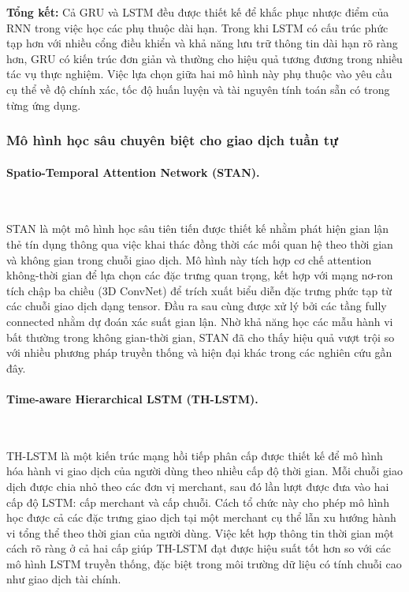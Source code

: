 \vspace{0.5em}

\textbf{Tổng kết:} Cả GRU và LSTM đều được thiết kế để khắc phục nhược điểm của RNN trong việc học các phụ thuộc dài hạn. Trong khi LSTM có cấu trúc phức tạp hơn với nhiều cổng điều khiển và khả năng lưu trữ thông tin dài hạn rõ ràng hơn, GRU có kiến trúc đơn giản và thường cho hiệu quả tương đương trong nhiều tác vụ thực nghiệm. Việc lựa chọn giữa hai mô hình này phụ thuộc vào yêu cầu cụ thể về độ chính xác, tốc độ huấn luyện và tài nguyên tính toán sẵn có trong từng ứng dụng.


\subsubsection{Mô hình học sâu chuyên biệt cho giao dịch tuần tự}

\paragraph{Spatio-Temporal Attention Network (STAN).}~

STAN \cite{cheng2020spatio} là một mô hình học sâu tiên tiến được thiết kế nhằm phát hiện gian lận thẻ tín dụng thông qua việc khai thác đồng thời các mối quan hệ theo thời gian và không gian trong chuỗi giao dịch. Mô hình này tích hợp cơ chế attention không-thời gian để lựa chọn các đặc trưng quan trọng, kết hợp với mạng nơ-ron tích chập ba chiều (3D ConvNet) để trích xuất biểu diễn đặc trưng phức tạp từ các chuỗi giao dịch dạng tensor. Đầu ra sau cùng được xử lý bởi các tầng fully connected nhằm dự đoán xác suất gian lận. Nhờ khả năng học các mẫu hành vi bất thường trong không gian-thời gian, STAN đã cho thấy hiệu quả vượt trội so với nhiều phương pháp truyền thống và hiện đại khác trong các nghiên cứu gần đây.

\paragraph{Time-aware Hierarchical LSTM (TH-LSTM).}~

TH-LSTM \cite{Xie2022} là một kiến trúc mạng hồi tiếp phân cấp được thiết kế để mô hình hóa hành vi giao dịch của người dùng theo nhiều cấp độ thời gian. Mỗi chuỗi giao dịch được chia nhỏ theo các đơn vị merchant, sau đó lần lượt được đưa vào hai cấp độ LSTM: cấp merchant và cấp chuỗi. Cách tổ chức này cho phép mô hình học được cả các đặc trưng giao dịch tại một merchant cụ thể lẫn xu hướng hành vi tổng thể theo thời gian của người dùng. Việc kết hợp thông tin thời gian một cách rõ ràng ở cả hai cấp giúp TH-LSTM đạt được hiệu suất tốt hơn so với các mô hình LSTM truyền thống, đặc biệt trong môi trường dữ liệu có tính chuỗi cao như giao dịch tài chính.


